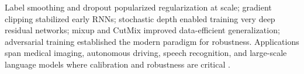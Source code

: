 \begin{remark}
Label smoothing and dropout popularized regularization at scale; gradient clipping stabilized early RNNs; stochastic depth enabled training very deep residual networks; mixup and CutMix improved data-efficient generalization; adversarial training established the modern paradigm for robustness. Applications span medical imaging, autonomous driving, speech recognition, and large-scale language models where calibration and robustness are critical \cite{GoodfellowEtAl2016,He2016,Ioffe2015}.
\end{remark}

